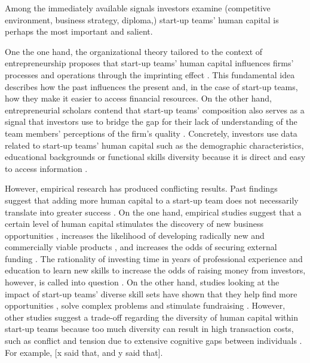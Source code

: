 \documentclass[12pt]{article}
\begin{document}
Among the immediately available signals investors examine (competitive environment, business strategy, diploma,) start-up teams' human capital is perhaps the most important and salient.

One the one hand, the organizational theory tailored to the context of entrepreneurship proposes that start-up teams' human capital influences firms' processes and operations through the imprinting effect \citep{packalen2007complementing}. This fundamental idea describes how the past influences the present and, in the case of start-up teams, how they make it easier to access financial resources. On the other hand, entrepreneurial scholars contend that start-up teams' composition also serves as a signal \citep{spence1974market} that investors use to bridge the gap for their lack of understanding of the team members' perceptions of the firm's quality \citep{plummer2016better}. Concretely, investors use data related to start-up teams' human capital such as the demographic characteristics, educational backgrounds or functional skills diversity because it is direct and easy to access information \citep{colombo2005founders, beckman2007early, eddleston2016you}.

However, empirical research has produced conflicting results. Past findings suggest that adding more human capital to a start-up team does not necessarily translate into greater success \citep{pierce2013too}. On the one hand, empirical studies suggest that a certain level of human capital stimulates the discovery of new business opportunities \citep{shane2000promise, marvel2016human}, increases the likelihood of developing radically new and commercially viable products \citep{marvel2007technology}, and increases the odds of securing external funding \citep{beckman2007early}. The rationality of investing time in years of professional experience and education to learn new skills to increase the odds of raising money from investors, however, is called into question \citep{audretsch2004financing}. On the other hand, studies looking at the impact of start-up teams' diverse skill sets have shown that they help find more opportunities \citep{shane2000prior}, solve complex problems \citep{hong2001problem} and stimulate fundraising \citep{ko2018signaling}. However, other studies suggest a trade-off regarding the diversity of human capital within start-up teams because too much diversity can result in high transaction costs, such as conflict and tension due to extensive cognitive gaps between individuals \citep{nooteboom2007optimal}. For example, [x said that, and y said that].
\end{document}
